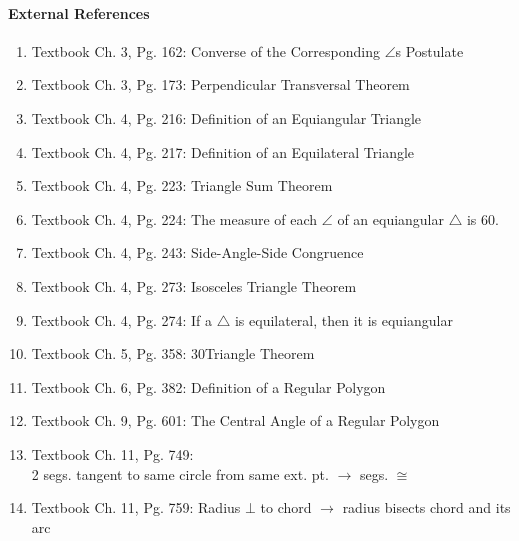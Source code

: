 \documentclass[letterpaper,12pt,twoside]{report}
\begin{document}
	
	\paragraph{External References}
	\begin{enumerate}
		\item Textbook Ch. 3, Pg. 162: Converse of the Corresponding $\angle$s Postulate
		\item Textbook Ch. 3, Pg. 173: Perpendicular Transversal Theorem
		\item Textbook Ch. 4, Pg. 216: Definition of an Equiangular Triangle
		\item Textbook Ch. 4, Pg. 217: Definition of an Equilateral Triangle
		
		\item Textbook Ch. 4, Pg. 223: Triangle Sum Theorem
		\item Textbook Ch. 4, Pg. 224: The measure of each $\angle$ of an equiangular $\triangle$ is 60\textdegree.
		\item Textbook Ch. 4, Pg. 243: Side-Angle-Side Congruence
		\item Textbook Ch. 4, Pg. 273: Isosceles Triangle Theorem
		\item Textbook Ch. 4, Pg. 274: If a $\triangle$ is equilateral, then it is equiangular
		\item Textbook Ch. 5, Pg. 358: 30\textdegree \space Triangle Theorem
		\item Textbook Ch. 6, Pg. 382: Definition of a Regular Polygon
		\item Textbook Ch. 9, Pg. 601: The Central Angle of a Regular Polygon
		\item Textbook Ch. 11, Pg. 749: \\2 segs. tangent to same circle from same ext. pt. $\rightarrow$ segs. $\cong$
		\item Textbook Ch. 11, Pg. 759: Radius $\bot$ to chord $\rightarrow$ radius bisects chord and its arc
	\end{enumerate}
\end{document}
